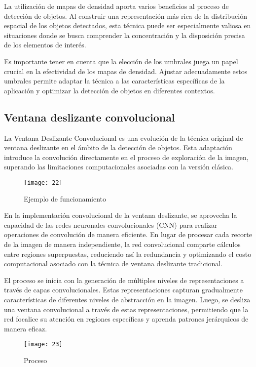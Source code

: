 	La utilización de mapas de densidad aporta varios beneficios al proceso de detección de objetos. Al construir una representación más rica de la distribución espacial de los objetos detectados, esta técnica puede ser especialmente valiosa en situaciones donde se busca comprender la concentración y la disposición precisa de los elementos de interés.
	
	Es importante tener en cuenta que la elección de los umbrales juega un papel crucial en la efectividad de los mapas de densidad. Ajustar adecuadamente estos umbrales permite adaptar la técnica a las características específicas de la aplicación y optimizar la detección de objetos en diferentes contextos.
	
	\subsection{Ventana deslizante convolucional}
	
	La Ventana Deslizante Convolucional es una evolución de la técnica original de ventana deslizante en el ámbito de la detección de objetos. Esta adaptación introduce la convolución directamente en el proceso de exploración de la imagen, superando las limitaciones computacionales asociadas con la versión clásica.
	\pagebreak
	\begin{figure}[ht]
	    \centering
		\texttt{[image: 22]}
		\caption{Ejemplo de funcionamiento}
	\end{figure}
	
	En la implementación convolucional de la ventana deslizante, se aprovecha la capacidad de las redes neuronales convolucionales (CNN) para realizar operaciones de convolución de manera eficiente. En lugar de procesar cada recorte de la imagen de manera independiente, la red convolucional comparte cálculos entre regiones superpuestas, reduciendo así la redundancia y optimizando el costo computacional asociado con la técnica de ventana deslizante tradicional.
	
	El proceso se inicia con la generación de múltiples niveles de representaciones a través de capas convolucionales. Estas representaciones capturan gradualmente características de diferentes niveles de abstracción en la imagen. Luego, se desliza una ventana convolucional a través de estas representaciones, permitiendo que la red focalice su atención en regiones específicas y aprenda patrones jerárquicos de manera eficaz.
	\begin{figure}[ht]
	    \centering
		\texttt{[image: 23]}
		\caption{Proceso}
	\end{figure}
	
